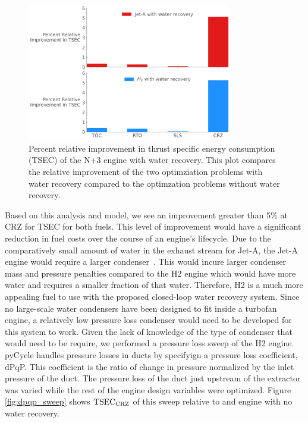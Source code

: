 \documentclass[conf]{new-aiaa}
\begin{document}
\begin{figure}[hbt!]
    \centering
    \includegraphics[width=0.8\textwidth]{JetA-H2_TSEC_diff.pdf}
    \caption{Percent relative improvement in thrust specific energy consumption (TSEC) of the N+3 engine with water recovery.
        This plot compares the relative improvement of the two optimziation problems with water recovery compared to the optimzation problems without water recovery.}
    \label{fig:barchart}
\end{figure}

Based on this analysis and model, we see an improvement greater than 5\% at CRZ for TSEC for both fuels.
This level of improvement would have a significant reduction in fuel costs over the course of an engine's lifecycle.
Due to the comparatively small amount of water in the exhaust stream for Jet-A, the Jet-A engine would require a larger condenser~\cite{Strom2002}.
This would incure larger condenser mass and pressure penalties compared to the H2 engine which would have more water and requires a smaller fraction of that water.
Therefore, H2 is a much more appealing fuel to use with the proposed closed-loop water recovery system.
Since no large-scale water condensers have been designed to fit inside a turbofan engine, a relatively low pressure loss condenser would need to be developed for this system to work.
Given the lack of knowledge of the type of condenser that would need to be require, we performed a pressure loss sweep of the H2 engine.
pyCycle handles pressure losses in ducts by specifyign a pressure loss coefficient, dPqP.
This coefficient is the ratio of change in pressure normalized by the inlet pressure of the duct.
The pressure loss of the duct just upstream of the extractor was varied while the rest of the engine design variables were optimized.
Figure \ref{fig:dpqp_sweep} shows $\rm{TSEC}_{\rm{CRZ}}$ of this sweep relative to and engine with no water recovery.
\end{document}
